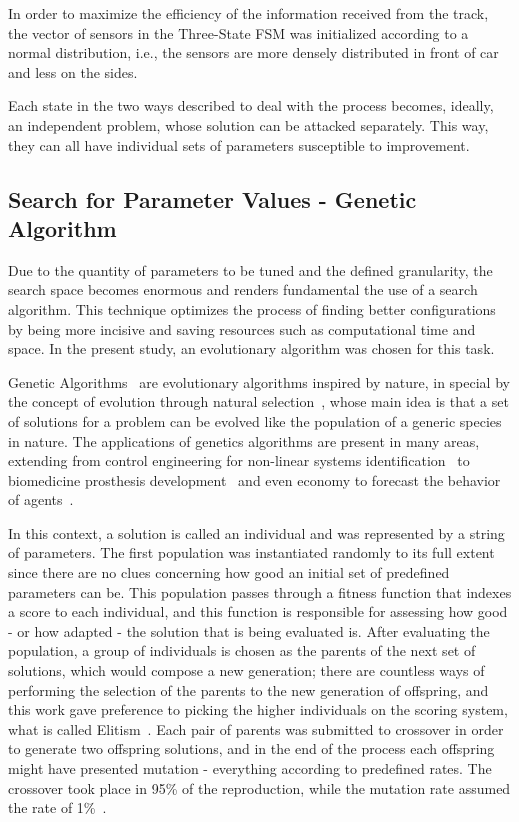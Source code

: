 	In order to maximize the efficiency of the information received from the track, the vector of sensors in the Three-State FSM was initialized according to a normal distribution, i.e., the sensors are more densely distributed in front of car and less on the sides.
	
	Each state in the two ways described to deal with the process becomes, ideally, an independent problem, whose solution can be attacked separately. This way, they can all have individual sets of parameters susceptible to improvement.
	
\subsection{Search for Parameter Values - Genetic Algorithm} \label{subsec:GA}
	
	Due to the quantity of parameters to be tuned and the defined granularity, the search space becomes enormous and renders fundamental the use of a search algorithm. This technique optimizes the process of finding better configurations by being more incisive and saving resources such as computational time and space. In the present study, an evolutionary algorithm was chosen for this task.
	
	Genetic Algorithms~\cite{GA} are evolutionary algorithms inspired by nature, in special by the concept of evolution through natural selection~\cite{Darwin}, whose main idea is that a set of solutions for a problem can be evolved like the population of a generic species in nature. The applications of genetics algorithms are present in many areas, extending from control engineering for non-linear systems identification~\cite{GACTRL} to biomedicine prosthesis development~\cite{GABIO} and even economy to forecast the behavior of agents~\cite{GAECO}.
	
	In this context, a solution is called an individual and was represented by a string of parameters. The first population was instantiated randomly to its full extent since there are no clues concerning how good an initial set of predefined parameters can be. This population passes through a fitness function that indexes a score to each individual, and this function is responsible for assessing how good - or how adapted - the solution that is being evaluated is. After evaluating the population, a group of individuals is chosen as the parents of the next set of solutions, which would compose a new generation; there are countless ways of performing the selection of the parents to the new generation of offspring, and this work gave preference to picking the higher individuals on the scoring system, what is called Elitism~\cite{ELITISM}. Each pair of parents was submitted to crossover in order to generate two offspring solutions, and in the end of the process each offspring might have presented mutation - everything according to predefined rates. The crossover took place in 95\% of the reproduction, while the mutation rate assumed the rate of 1\%~\cite{RATES}.
	
